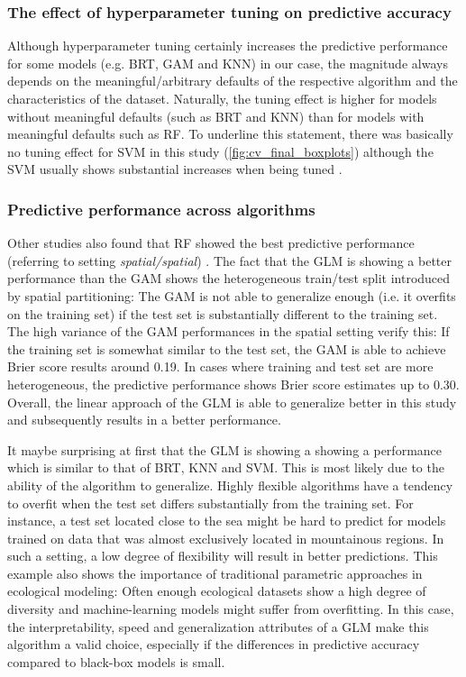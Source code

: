 \documentclass[review]{elsarticle}
\begin{document}
\subsubsection{The effect of hyperparameter tuning on predictive accuracy}
Although hyperparameter tuning certainly increases the predictive performance for some models (e.g. BRT, GAM and KNN) in our case, the magnitude always depends on the meaningful/arbitrary defaults of the respective algorithm and the characteristics of the dataset.
Naturally, the tuning effect is higher for models without meaningful defaults (such as BRT and KNN) than for models with meaningful defaults such as RF.
To underline this statement, there was basically no tuning effect for SVM in this study (\autoref{fig:cv_final_boxplots}) although the SVM usually shows substantial increases when being tuned \citep{Rojas_Dominguez2018}.

\subsubsection{Predictive performance across algorithms}
Other studies also found that RF showed the best predictive performance (referring to setting \emph{spatial/spatial}) \citep{Bahn2012, Jarnevich2017, Smolinski2016, Vorpahl2012}.
The fact that the GLM is showing a better performance than the GAM shows the heterogeneous train/test split introduced by spatial partitioning: The GAM is not able to generalize enough (i.e. it overfits on the training set) if the test set is substantially different to the training set.
The high variance of the GAM performances in the spatial setting verify this: If the training set is somewhat similar to the test set, the GAM is able to achieve Brier score results around 0.19. 
In cases where training and test set are more heterogeneous, the predictive performance shows Brier score estimates up to 0.30. 
Overall, the linear approach of the GLM is able to generalize better in this study and subsequently results in a better performance.

It maybe surprising at first that the GLM is showing a showing a performance which is similar to that of BRT, KNN and SVM.
This is most likely due to the ability of the algorithm to generalize.
Highly flexible algorithms have a tendency to overfit when the test set differs substantially from the training set. 
For instance, a test set located close to the sea might be hard to predict for models trained on data that was almost exclusively located in mountainous regions. 
In such a setting, a low degree of flexibility will result in better predictions. 
This example also shows the importance of traditional parametric approaches in ecological modeling: Often enough ecological datasets show a high degree of diversity and machine-learning models might suffer from overfitting.
In this case, the interpretability, speed and generalization attributes of a GLM make this algorithm a valid choice, especially if the differences in predictive accuracy compared to black-box models is small.
\end{document}
